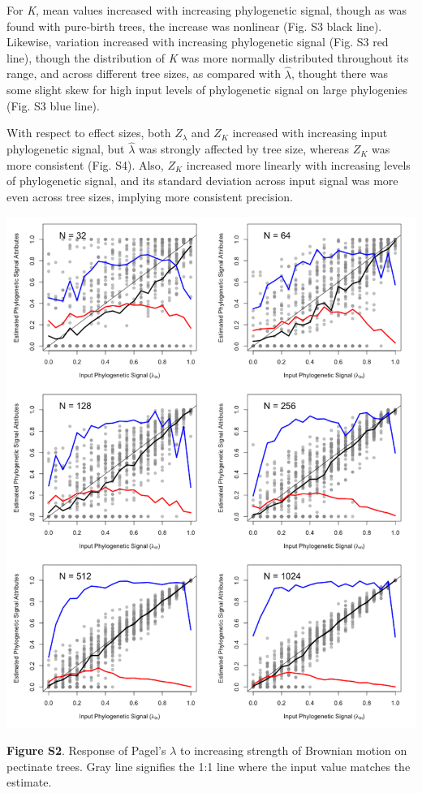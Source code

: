 \documentclass[
]{article}
\begin{document}
For \emph{K}, mean values increased with increasing phylogenetic signal,
though as was found with pure-birth trees, the increase was nonlinear
(Fig. S3 black line). Likewise, variation increased with increasing
phylogenetic signal (Fig. S3 red line), though the distribution of
\emph{K} was more normally distributed throughout its range, and across
different tree sizes, as compared with \(\hat{\lambda}\), thought there
was some slight skew for high input levels of phylogenetic signal on
large phylogenies (Fig. S3 blue line). \hfill\break

With respect to effect sizes, both \(Z_{\lambda}\) and \(Z_K\) increased
with increasing input phylogenetic signal, but \(\hat{\lambda}\) was
strongly affected by tree size, whereas \(Z_K\) was more consistent
(Fig. S4). Also, \(Z_K\) increased more linearly with increasing levels
of phylogenetic signal, and its standard deviation across input signal
was more even across tree sizes, implying more consistent precision.

\includegraphics[width=0.95\linewidth]{fig.S2}

\textbf{Figure S2}. Response of Pagel's \(\lambda\) to increasing
strength of Brownian motion on pectinate trees. Gray line signifies the
1:1 line where the input value matches the estimate.
\end{document}
